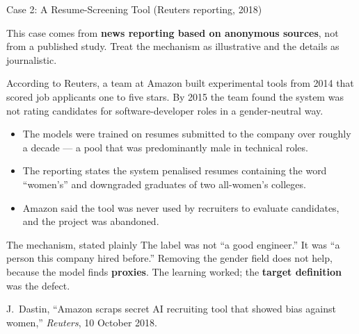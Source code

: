 
\begin{frame}[allowframebreaks]{Case 2: A Resume-Screening Tool (Reuters reporting, 2018)}

    \begin{tcolorbox}[colback=raiAmber!5, colframe=raiAmber!70, title=Note on evidence]
        \small This case comes from \textbf{news reporting based on anonymous sources}, not from a
        published study. Treat the mechanism as illustrative and the details as journalistic.
    \end{tcolorbox}

    \vspace{0.6em}

    According to Reuters, a team at Amazon built experimental tools from 2014 that scored job
    applicants one to five stars. By 2015 the team found the system was not rating candidates for
    software-developer roles in a gender-neutral way.

    \vspace{0.6em}

    \begin{itemize}
        \setlength\itemsep{0.4em}
        \item The models were trained on resumes submitted to the company over roughly a decade ---
              a pool that was predominantly male in technical roles.
        \item The reporting states the system penalised resumes containing the word
              ``women's'' and downgraded graduates of two all-women's colleges.
        \item Amazon said the tool was never used by recruiters to evaluate candidates, and the
              project was abandoned.
    \end{itemize}

    \vspace{0.5em}

    \begin{block}{The mechanism, stated plainly}
        \small The label was not ``a good engineer.'' It was ``a person this company hired
        before.'' Removing the gender field does not help, because the model finds
        \textbf{proxies}. The learning worked; the \textbf{target definition} was the defect.
    \end{block}

    \vspace{0.3em}
    {\scriptsize J.~Dastin, ``Amazon scraps secret AI recruiting tool that showed bias against
    women,'' \emph{Reuters}, 10 October 2018.}
\end{frame}
